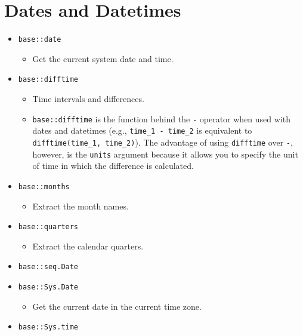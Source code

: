 \documentclass[
]{book}
\providecommand{\tightlist}{%
  \setlength{\itemsep}{0pt}\setlength{\parskip}{0pt}}
\begin{document}
\hypertarget{dates-and-datetimes-1}{%
\section{Dates and Datetimes}\label{dates-and-datetimes-1}}

\begin{itemize}
\tightlist
\item
  \texttt{base::date}

  \begin{itemize}
  \tightlist
  \item
    Get the current system date and time.
  \end{itemize}
\item
  \texttt{base::difftime}

  \begin{itemize}
  \tightlist
  \item
    Time intervals and differences.
  \item
    \texttt{base::difftime} is the function behind the \texttt{-} operator when used with dates and datetimes (e.g., \texttt{time\_1\ -\ time\_2} is equivalent to \texttt{difftime(time\_1,\ time\_2)}). The advantage of using \texttt{difftime} over \texttt{-}, however, is the \texttt{units} argument because it allows you to specify the unit of time in which the difference is calculated.
  \end{itemize}
\item
  \texttt{base::months}

  \begin{itemize}
  \tightlist
  \item
    Extract the month names.
  \end{itemize}
\item
  \texttt{base::quarters}

  \begin{itemize}
  \tightlist
  \item
    Extract the calendar quarters.
  \end{itemize}
\item
  \texttt{base::seq.Date}
\item
  \texttt{base::Sys.Date}

  \begin{itemize}
  \tightlist
  \item
    Get the current date in the current time zone.
  \end{itemize}
\item
  \texttt{base::Sys.time}


\end{itemize}
\end{document}
